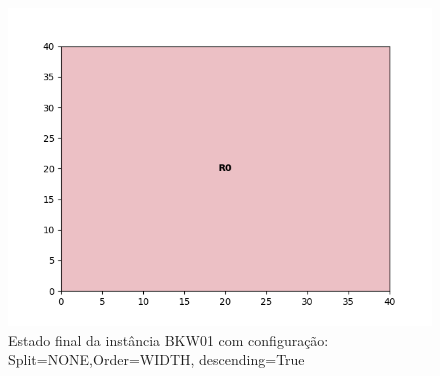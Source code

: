 \begin{figure}[H]
    \centering
    \caption[]{Estado final da instância BKW01 com configuração: Split=NONE,Order=WIDTH, descending=True}
    \label{fig:bkw01-none-width-true}
    \includegraphics[scale=0.5]{output/figures/bkw/bkw01/none/width/true/00}
\end{figure}